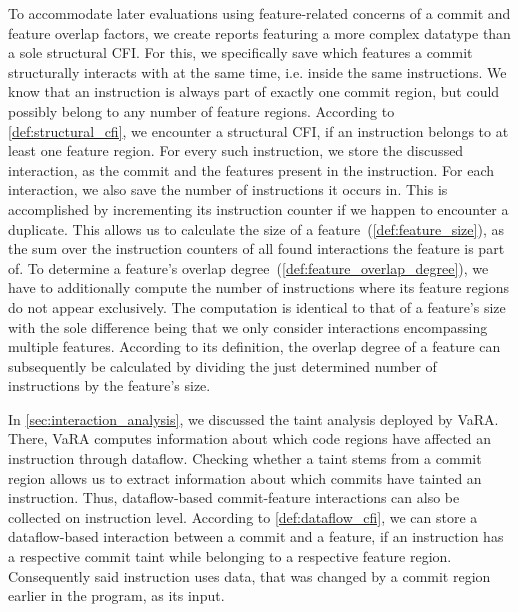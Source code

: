 To accommodate later evaluations using feature-related concerns of a commit and feature overlap factors, we create reports featuring a more complex datatype than a sole structural CFI.
For this, we specifically save which features a commit structurally interacts with at the same time, i.e. inside the same instructions.
We know that an instruction is always part of exactly one commit region, but could possibly belong to any number of feature regions.
According to \autoref{def:structural_cfi}, we encounter a structural CFI, if an instruction belongs to at least one feature region.
For every such instruction, we store the discussed interaction, as the commit and the features present in the instruction.
For each interaction, we also save the number of instructions it occurs in. 
This is accomplished by incrementing its instruction counter if we happen to encounter a duplicate. 
This allows us to calculate the size of a feature~(\autoref{def:feature_size}), as the sum over the instruction counters of all found interactions the feature is part of.
To determine a feature's overlap degree~(\autoref{def:feature_overlap_degree}), we have to additionally compute the number of instructions where its feature regions do not appear exclusively.
The computation is identical to that of a feature's size with the sole difference being that we only consider interactions encompassing multiple features.
According to its definition, the overlap degree of a feature can subsequently be calculated by dividing the just determined number of instructions by the feature's size.

In \autoref{sec:interaction_analysis}, we discussed the taint analysis deployed by VaRA.
There, VaRA computes information about which code regions have affected an instruction through dataflow.
Checking whether a taint stems from a commit region allows us to extract information about which commits have tainted an instruction.
Thus, dataflow-based commit-feature interactions can also be collected on instruction level.
According to \autoref{def:dataflow_cfi}, we can store a dataflow-based interaction between a commit and a feature, if an instruction has a respective commit taint while belonging to a respective feature region.
Consequently said instruction uses data, that was changed by a commit region earlier in the program, as its input. 


